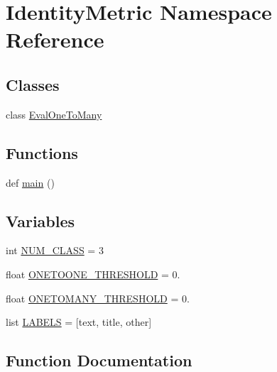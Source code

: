 \hypertarget{namespace_identity_metric}{}\section{Identity\+Metric Namespace Reference}
\label{namespace_identity_metric}
\subsection*{Classes}
\begin{DoxyCompactItemize}
\item 
class \hyperlink{class_identity_metric_1_1_eval_one_to_many}{Eval\+One\+To\+Many}
\end{DoxyCompactItemize}
\subsection*{Functions}
\begin{DoxyCompactItemize}
\item 
def \hyperlink{namespace_identity_metric_a71cc90681b715ff30d755969fecf92e0}{main} ()
\end{DoxyCompactItemize}
\subsection*{Variables}
\begin{DoxyCompactItemize}
\item 
int \hyperlink{namespace_identity_metric_aa5c149505f3884e7e279f6134219d08f}{N\+U\+M\+\_\+\+C\+L\+A\+S\+S} = 3
\item 
float \hyperlink{namespace_identity_metric_a2f62a256a9868cd3120fe904bfb16eb8}{O\+N\+E\+T\+O\+O\+N\+E\+\_\+\+T\+H\+R\+E\+S\+H\+O\+L\+D} = 0.
\item 
float \hyperlink{namespace_identity_metric_a6f03e9db94381dfdb31d92190ab42daa}{O\+N\+E\+T\+O\+M\+A\+N\+Y\+\_\+\+T\+H\+R\+E\+S\+H\+O\+L\+D} = 0.
\item 
list \hyperlink{namespace_identity_metric_ad6d6fc82d974ead73cdbabea114da38d}{L\+A\+B\+E\+L\+S} = \mbox{[}\textquotesingle{}text\textquotesingle{}, \textquotesingle{}title\textquotesingle{}, \textquotesingle{}other\textquotesingle{}\mbox{]}
\end{DoxyCompactItemize}


\subsection{Function Documentation}
\hypertarget{namespace_identity_metric_a71cc90681b715ff30d755969fecf92e0}{}
